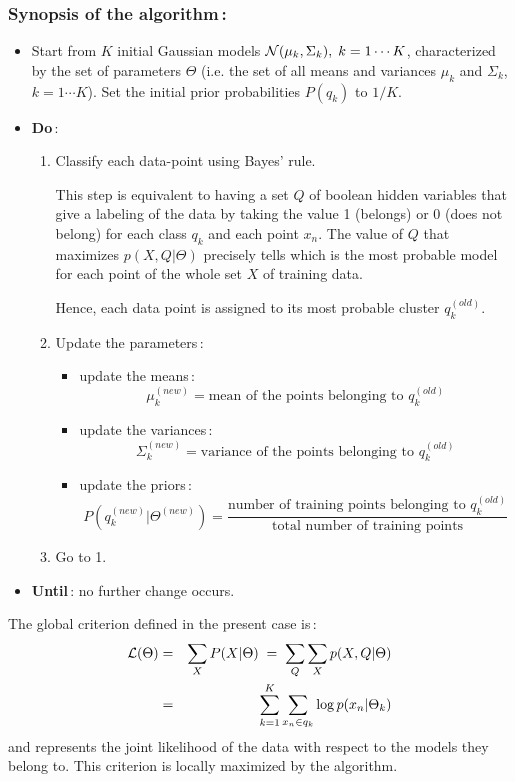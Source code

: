 \documentclass[twoside,a4paper,titlepage]{article}
\begin{document}
\subsubsection*{Synopsis of the algorithm\,:}
\begin{itemize}
\item Start from $K$ initial Gaussian models ${\cal N}(\mu_{k},\Sigma_{k}),
\; k=1\cdots K$, characterized by the set of parameters $\Theta$ (i.e. the
set of all means and variances $\mu_k$ and $\Sigma_k$, $k=1\cdots K$). Set
the initial prior probabilities $P(q_k)$ to $1/K$.
\item {\bf Do}\,:
\begin{enumerate}
\item Classify each data-point using Bayes' rule.

This step is equivalent to having a set $Q$ of boolean hidden variables
that give a labeling of the data by taking the value 1 (belongs) or 0 (does
not belong) for each class $q_k$ and each point $x_n$. The value of $Q$
that maximizes $p(X,Q|\Theta)$ precisely tells which is the most probable
model for each point of the whole set $X$ of training data.

Hence, each data point is assigned to its most probable cluster $q_k^{(old)}$.
\item Update the parameters\,:
\begin{itemize}
\item update the means\,:
	\[ \mu_{k}^{(new)} = \mbox{mean of the points belonging to } q_k^{(old)} \]
\item update the variances\,:
	\[ \Sigma_{k}^{(new)} = \mbox{variance of the points belonging to } q_k^{(old)} \]
\item update the priors\,:
	\[ P(q_k^{(new)}|\Theta^{(new)}) = \frac{\mbox{number of training points
	belonging to } q_k^{(old)} }{\mbox{total number of training points}}\]
\end{itemize}
\item Go to 1.
\end{enumerate}
\item {\bf Until}\,: no further change occurs.
\end{itemize}
The global criterion defined in the present case is\,:
\begin{eqnarray}
{\cal L}(\Theta) & = & \sum_{X} P(X|\Theta) \; = \; \sum_{Q} \sum_{X} p(X,Q|\Theta) \nonumber \\
      & = & \sum_{k=1}^{K} \sum_{x_n \in q_k} \log p(x_n|\Theta_k) \nonumber
\end{eqnarray}
and represents the joint likelihood of the data with respect to the models
they belong to. This criterion is locally maximized by the algorithm.
\end{document}
